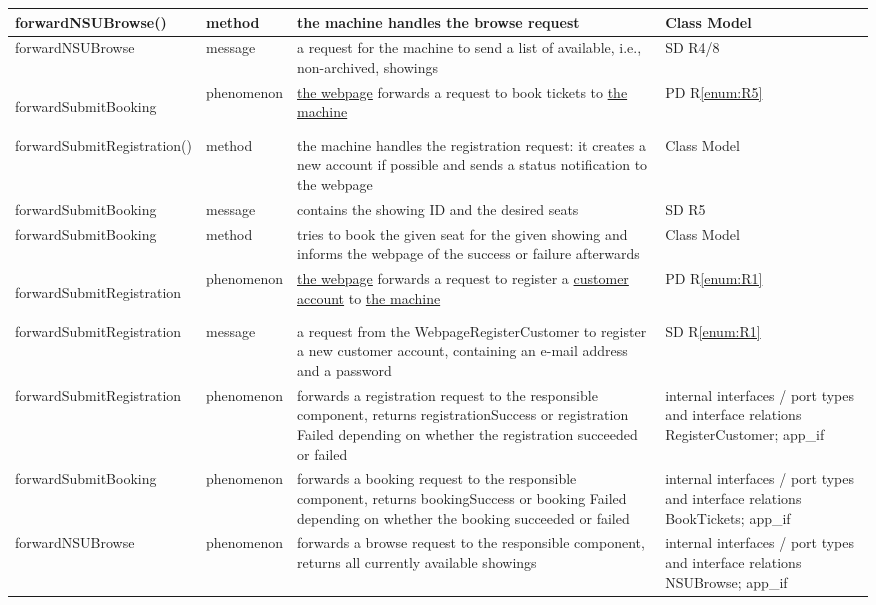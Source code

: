 \documentclass[a4paper,10pt,titlepage,bibtotoc,bibtotocnumbered]{scrreprt}
\begin{document}
\begin{longtable}{|p{.4\linewidth}|p{.2\linewidth}|p{.2\linewidth}|p{.2\linewidth}|}
\hline
forwardNSUBrowse() & method & the machine handles the browse request & Class Model\\
\hline
forwardNSUBrowse & message & a request for the machine to send a list of available, i.e., non-archived, showings & SD R4/8\\
\hline
\hypertarget{glossary:forwardSubmitBooking}{forwardSubmitBooking} & phenomenon & \hyperlink{glossary:WebpageBookTickets}{the webpage} forwards a request to book tickets to \hyperlink{glossary:UDEKino}{the machine} & PD R\ref{enum:R5}\\
\hline
forwardSubmitRegistration() & method & the machine handles the registration request: it creates a new account if possible and sends a status notification to the webpage & Class Model\\
\hline
forwardSubmitBooking & message & contains the showing ID and the desired seats & SD R5\\
\hline
forwardSubmitBooking & method & tries to book the given seat for the given showing and informs the webpage of the success or failure afterwards & Class Model\\
\hline
\hypertarget{glossary:forwardSubmitRegistration}{forwardSubmitRegistration} & phenomenon & \hyperlink{glossary:WebpageRegisterCustomer}{the webpage} forwards a request to register a \hyperlink{glossary:Customer}{customer account} to \hyperlink{glossary:UDEKino}{the machine} & PD R\ref{enum:R1}\\
\hline
forwardSubmitRegistration & message & a request from the WebpageRegisterCustomer to register a new customer account, containing an e-mail address and a password & SD R\ref{enum:R1}\\
\hline
forwardSubmitRegistration & phenomenon & forwards a registration request to the responsible component, returns registrationSuccess or registration Failed depending on whether the registration succeeded or failed & internal interfaces / port types and interface relations RegisterCustomer; app\_if\\
\hline
forwardSubmitBooking & phenomenon & forwards a booking request to the responsible component, returns bookingSuccess or booking Failed depending on whether the booking succeeded or failed & internal interfaces / port types and interface relations BookTickets; app\_if\\
\hline
forwardNSUBrowse & phenomenon & forwards a browse request to the responsible component, returns all currently available showings & internal interfaces / port types and interface relations NSUBrowse; app\_if\\

\end{longtable}
\end{document}
